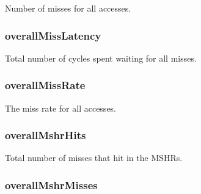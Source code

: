 \label{group__CacheStatistics_ga15889ae23e7332b01de9bc31e05a21e5}
Number of misses for all accesses. \hypertarget{group__CacheStatistics_ga7d70913fe3dbd532369b977f9a28446c}{
\subsubsection[{overallMissLatency}]{ overallMissLatency}}
\label{group__CacheStatistics_ga7d70913fe3dbd532369b977f9a28446c}
Total number of cycles spent waiting for all misses. \hypertarget{group__CacheStatistics_ga61b6b530510b172ca4c2774dd939debf}{
\subsubsection[{overallMissRate}]{ overallMissRate}}
\label{group__CacheStatistics_ga61b6b530510b172ca4c2774dd939debf}
The miss rate for all accesses. \hypertarget{group__CacheStatistics_ga0fb9f1f22aa968d550eef9c03997ac18}{
\subsubsection[{overallMshrHits}]{ overallMshrHits}}
\label{group__CacheStatistics_ga0fb9f1f22aa968d550eef9c03997ac18}
Total number of misses that hit in the MSHRs. \hypertarget{group__CacheStatistics_ga89bdc1747e7c539c145e1721f92e9077}{
\subsubsection[{overallMshrMisses}]{ overallMshrMisses}}
